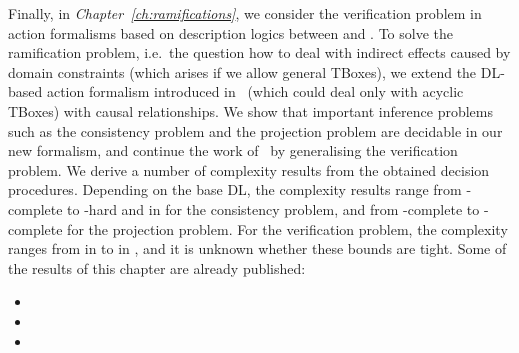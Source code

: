 Finally, in \emph{Chapter~\ref{ch:ramifications}}, we consider the verification
problem in action formalisms based on description logics between \ALC and
\ALCQIO.  To solve the ramification problem, i.e.~the question how to deal with
indirect effects caused by domain constraints (which arises if we allow general
TBoxes), we extend the DL-based action formalism introduced
in~\cite{BLM+-AAAI05} (which could deal only with acyclic TBoxes) with causal
relationships.  We show that important inference problems such as the
consistency problem and the projection problem are decidable in our new
formalism, and continue the work of~\cite{BaLM-ECAI10} by generalising the
verification problem.  We derive a number of complexity results from the
obtained decision procedures.  Depending on the base DL, the complexity results
range from \PSpace-complete to \coNExpTime-hard and in \PTimeToNExpTime for the
consistency problem, and from \PSpace-complete to \coNExpTime-complete for the
projection problem.  For the verification problem, the complexity ranges from in
\ExpSpace to in \coTwoNExpTime, and it is unknown whether these bounds are
tight.
%
Some of the results of this chapter are already published:
\begin{itemize}
    \item {}
    \item {}
    \item {}
\end{itemize}
